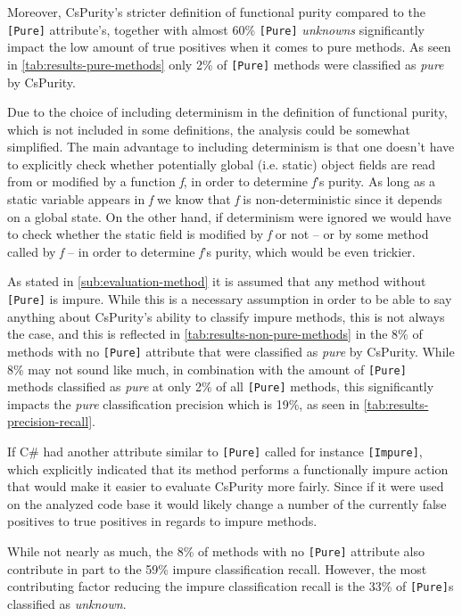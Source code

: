 \documentclass[a4paper,12pt]{article}
\begin{document}
Moreover, CsPurity's stricter definition of functional purity compared to the \texttt{[Pure]} attribute's, together with almost 60\% \texttt{[Pure]} \textit{unknowns} significantly impact the low amount of true positives when it comes to pure methods. As seen in \autoref{tab:results-pure-methods} only 2\% of \texttt{[Pure]} methods were classified as \textit{pure} by CsPurity.

Due to the choice of including determinism in the definition of functional purity, which is not included in some definitions, the analysis could be somewhat simplified. The main advantage to including determinism is that one doesn't have to explicitly check whether potentially global (i.e. static) object fields are read from or modified by a function \textit{f}, in order to determine \textit{f}'s purity. As long as a static variable appears in \textit{f} we know that \textit{f} is non-deterministic since it depends on a global state. On the other hand, if determinism were ignored we would have to check whether the static field is modified by \textit{f} or not -- or by some method called by \textit{f} -- in order to determine \textit{f}'s purity, which would be even trickier.

As stated in \autoref{sub:evaluation-method} it is assumed that any method without \texttt{[Pure]} is impure. While this is a necessary assumption in order to be able to say anything about CsPurity's ability to classify impure methods, this is not always the case, and this is reflected in \autoref{tab:results-non-pure-methods} in the 8\% of methods with no \texttt{[Pure]} attribute that were classified as \textit{pure} by CsPurity. While 8\% may not sound like much, in combination with the amount of \texttt{[Pure]} methods classified as \textit{pure} at only 2\% of all \texttt{[Pure]} methods, this significantly impacts the \textit{pure} classification precision which is 19\%, as seen in \autoref{tab:results-precision-recall}.

If C\# had another attribute similar to \texttt{[Pure]} called for instance \texttt{[Impure]}, which explicitly indicated that its method performs a functionally impure action that would make it easier to evaluate CsPurity more fairly. Since if it were used on the analyzed code base it would likely change a number of the currently false positives to true positives in regards to impure methods. %

While not nearly as much, the 8\% of methods with no \texttt{[Pure]} attribute also contribute in part to the 59\% impure classification recall. However, the most contributing factor reducing the impure classification recall is the 33\% of \texttt{[Pure]}s classified as \textit{unknown}.
\end{document}
